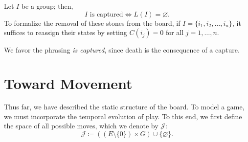 \begin{definition}
	Let $I$ be a group; then,
	$$I \text{ is captured} \iff L(I) = \varnothing.$$
	To formalize the removal of these stones from the board, if \(I = \{i_1, i_2, \dots, i_n\}\), it suffices to reassign their states by setting \(C(i_j) = 0\) for all \(j=1, \dots, n\).
\end{definition}

We favor the phrasing \textit{is captured}, since death is the consequence of a capture.

\section{Toward Movement}

Thus far, we have described the static structure of the board. To model a game, we must incorporate the temporal evolution of play. To this end, we first define the space of all possible moves, which we denote by \(\mathcal{J}\):
$$\mathcal{J} \coloneqq \left((E \setminus \{0\}) \times G\right) \cup \{\varnothing\}.$$

